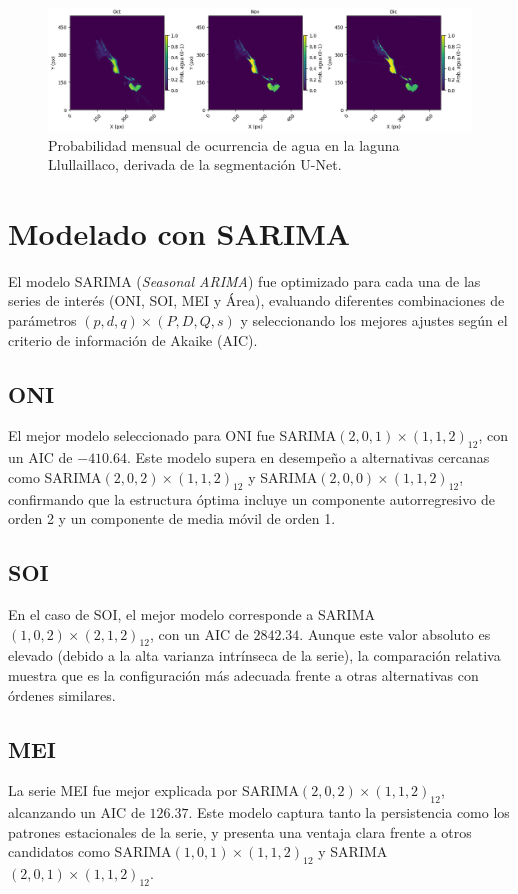 \begin{figure}[H]
    \centering
    \includegraphics[scale=0.31]{Figures/prob_agua2.png}
    \caption{Probabilidad mensual de ocurrencia de agua en la laguna Llullaillaco, derivada de la segmentación U-Net.}
    \label{fig:prob_agua_mensual2}
\end{figure}

\section{Modelado con SARIMA}

El modelo SARIMA (\textit{Seasonal ARIMA}) fue optimizado para cada una de las series de interés (ONI, SOI, MEI y Área), evaluando diferentes combinaciones de parámetros $(p,d,q)\times(P,D,Q,s)$ y seleccionando los mejores ajustes según el criterio de información de Akaike (AIC). 

\subsection{ONI}
El mejor modelo seleccionado para ONI fue SARIMA$(2,0,1)\times(1,1,2)_{12}$, con un AIC de $-410.64$. Este modelo supera en desempeño a alternativas cercanas como SARIMA$(2,0,2)\times(1,1,2)_{12}$ y SARIMA$(2,0,0)\times(1,1,2)_{12}$, confirmando que la estructura óptima incluye un componente autorregresivo de orden 2 y un componente de media móvil de orden 1.

\subsection{SOI}
En el caso de SOI, el mejor modelo corresponde a SARIMA$(1,0,2)\times(2,1,2)_{12}$, con un AIC de $2842.34$. Aunque este valor absoluto es elevado (debido a la alta varianza intrínseca de la serie), la comparación relativa muestra que es la configuración más adecuada frente a otras alternativas con órdenes similares.

\subsection{MEI}
La serie MEI fue mejor explicada por SARIMA$(2,0,2)\times(1,1,2)_{12}$, alcanzando un AIC de $126.37$. Este modelo captura tanto la persistencia como los patrones estacionales de la serie, y presenta una ventaja clara frente a otros candidatos como SARIMA$(1,0,1)\times(1,1,2)_{12}$ y SARIMA$(2,0,1)\times(1,1,2)_{12}$.

